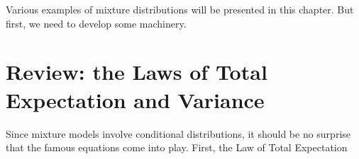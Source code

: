 Various examples of mixture distributions will be presented in this
chapter.  But first, we need to develop some machinery.

% 
% 
% 
% 
% 
% 
% 
% 
% 
% 
% 

\section{Review: the Laws of Total Expectation and Variance}
\label{lte}

Since mixture models involve conditional distributions, it should be no
surprise that the famous equations come into play.  First, the Law  of
Total Expectation

